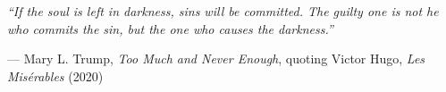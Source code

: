 \documentclass[12pt]{article}
\begin{document}
\noindent
\textit{“If the soul is left in darkness, sins will be committed. The guilty one is not he who commits the sin, but the one who causes the darkness.”} \\

\vspace{1em}
\begin{flushright}
— Mary L. Trump, \textit{Too Much and Never Enough}, quoting Victor Hugo, \textit{Les Misérables} (2020)
\end{flushright}
\end{document}
